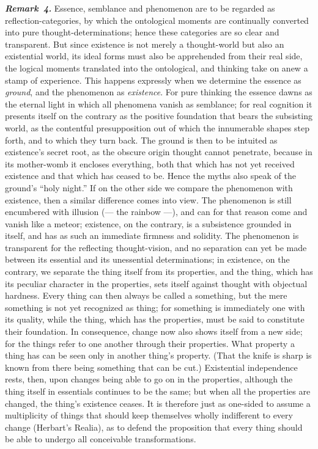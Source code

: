 \documentclass[12pt]{book}
\newcommand{\anm}[1]{\emph{\textbf{Remark~#1.}}}
\begin{document}
\anm{4} Essence, semblance and phenomenon are to be regarded as
reflection-categories, by which the ontological moments are continually
converted into pure thought-determinations; hence these categories are so
clear and transparent. But since existence is not merely a thought-world but
also an existential world, its ideal forms must also be apprehended from
their real side, the logical moments translated into the ontological, and
thinking take on anew a stamp of experience. This happens expressly when we
determine the essence as \emph{ground}, and the phenomenon as
\emph{existence}. For pure thinking the essence dawns as the eternal light
in which all phenomena vanish as semblance; for real cognition it presents
itself on the contrary as the positive foundation that bears the subsisting
world, as the contentful presupposition out of which the innumerable shapes
step forth, and to which they turn back. The ground is then to be intuited
as existence's secret root, as the obscure origin thought cannot penetrate,
because in its mother-womb it encloses everything, both that which has not
yet received existence and that which has ceased to be. Hence the myths also
speak of the ground's ``holy night.'' If on the other side we compare the
phenomenon with existence, then a similar difference comes into view. The
phenomenon is still encumbered with illusion (--- the rainbow ---), and can
for that reason come and vanish like a meteor; existence, on the contrary,
is a subsistence grounded in itself, and has as such an immediate firmness
and solidity. The phenomenon is transparent for the reflecting
thought-vision, and no separation can yet be made between its essential and
its unessential determinations; in existence, on the contrary, we separate
the thing itself from its properties, and the thing, which has its peculiar
character in the properties, sets itself against thought with objectual
hardness. Every thing can then always be called a something, but the mere
something is not yet recognized as thing; for something is immediately one
with its quality, while the thing, which has the properties, must be said to
constitute their foundation. In consequence, change now also shows itself
from a new side; for the things refer to one another through their
properties. What property a thing has can be seen only in another thing's
property. (That the knife is sharp is known from there being something that
can be cut.) Existential independence rests, then, upon changes being able
to go on in the properties, although the thing itself in essentials
continues to be the same; but when all the properties are changed, the
thing's existence ceases. It is therefore just as one-sided to assume a
multiplicity of things that should keep themselves wholly indifferent to
every change (Herbart's Realia), as to defend the proposition that every
thing should be able to undergo all conceivable transformations.
\end{document}
